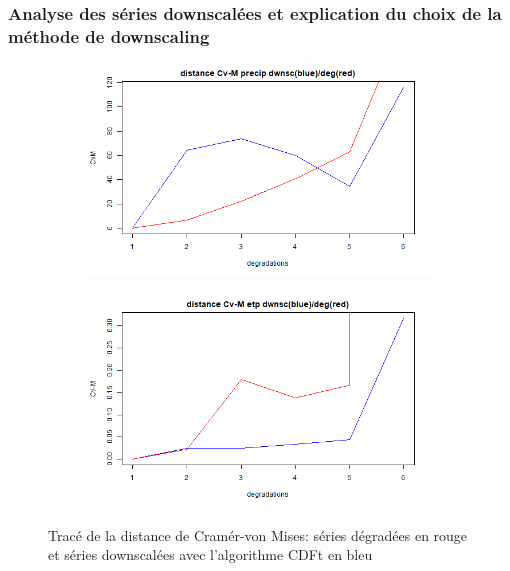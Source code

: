 \documentclass[a4paper,11pt]{article}
\numberwithin{equation}{section}
\begin{document}
\subsubsection{Analyse des séries downscalées et explication du choix de la méthode de downscaling}

\begin{figure}[H]
	\label{fig-res_CVM_CDFt}
	\centering
	\begin{subfigure}[b]{0.45\textwidth}
		\includegraphics[scale=0.38]{images/Dist_CVM_precip_CDFt.png}
	\end{subfigure}
	\hfill
	\begin{subfigure}[b]{0.45\textwidth}
		\includegraphics[scale=0.38]{images/Dist_CVM_evap_CDFt.png}
	\end{subfigure}
	\caption{Tracé de la distance de Cramér-von Mises: séries dégradées en rouge et séries downscalées avec l'algorithme CDFt en bleu}
	\label{fig-CVM-Var}
\end{figure}
\end{document}
